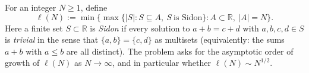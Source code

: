 For an integer $N\ge 1$, define
\[
\ell(N):=\min\Big\{\max\{|S|:S\subseteq A,\ S\ \text{is Sidon}\}: A\subset\mathbb R,\ |A|=N\Big\}.
\]
Here a finite set $S\subset\mathbb R$ is \emph{Sidon} if every solution to $a+b=c+d$ with $a,b,c,d\in S$ is \emph{trivial} in the sense that $\{a,b\}=\{c,d\}$ as multisets (equivalently: the sums $a+b$ with $a\le b$ are all distinct).
The problem asks for the asymptotic order of growth of $\ell(N)$ as $N\to\infty$, and in particular whether $\ell(N)\sim N^{1/2}$.
